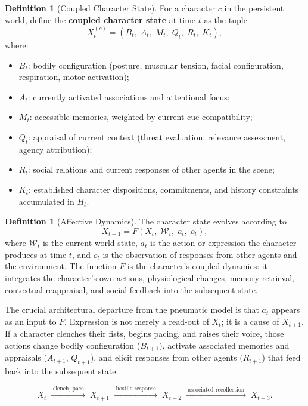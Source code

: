 \documentclass[11pt,a4paper]{article}
\theoremstyle{plain}
\theoremstyle{definition}
\newtheorem{definition}[theorem]{Definition}
\theoremstyle{remark}
\begin{document}
\begin{definition}[Coupled Character State]
For a character $c$ in the persistent world, define the \textbf{coupled character state} at time $t$ as the tuple
\[
X_t^{(c)} = (B_t,\; A_t,\; M_t,\; Q_t,\; R_t,\; K_t),
\]
where:
\begin{itemize}[leftmargin=2em,itemsep=0pt]
\item $B_t$: bodily configuration (posture, muscular tension, facial configuration, respiration, motor activation);
\item $A_t$: currently activated associations and attentional focus;
\item $M_t$: accessible memories, weighted by current cue-compatibility;
\item $Q_t$: appraisal of current context (threat evaluation, relevance assessment, agency attribution);
\item $R_t$: social relations and current responses of other agents in the scene;
\item $K_t$: established character dispositions, commitments, and history constraints accumulated in $H_t$.
\end{itemize}
\end{definition}

\begin{definition}[Affective Dynamics]
The character state evolves according to
\[
X_{t+1} = F(X_t,\; \mathcal{W}_t,\; a_t,\; o_t),
\]
where $\mathcal{W}_t$ is the current world state, $a_t$ is the action or expression the character produces at time $t$, and $o_t$ is the observation of responses from other agents and the environment. The function $F$ is the character's coupled dynamics: it integrates the character's own actions, physiological changes, memory retrieval, contextual reappraisal, and social feedback into the subsequent state.
\end{definition}

The crucial architectural departure from the pneumatic model is that $a_t$ appears as an input to $F$. Expression is not merely a read-out of $X_t$; it is a cause of $X_{t+1}$. If a character clenches their fists, begins pacing, and raises their voice, those actions change bodily configuration ($B_{t+1}$), activate associated memories and appraisals ($A_{t+1}$, $Q_{t+1}$), and elicit responses from other agents ($R_{t+1}$) that feed back into the subsequent state:

\[
X_t \;\xrightarrow{\;\text{clench, pace}\;}\; X_{t+1} \;\xrightarrow{\;\text{hostile response}\;}\; X_{t+2} \;\xrightarrow{\;\text{associated recollection}\;}\; X_{t+3}.
\]
\end{document}
